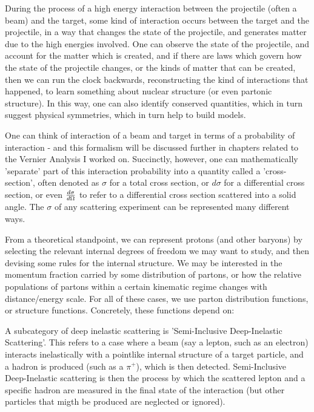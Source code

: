 During the process of a high energy interaction between the projectile (often a
beam) and the target,  some kind of interaction occurs between the target and
the projectile, in a way that changes the state of the projectile, and generates
matter due to the high energies involved. One can observe the state of the
projectile, and account for the matter which is created, and if there are laws
which govern how the state of the projectile changes, or the kinds of matter
that can be created, then we can run the clock backwards, reconstructing the
kind of interactions that happened, to learn something about nuclear structure
(or even partonic structure). In this way, one can also identify conserved
quantities, which in turn suggest physical symmetries, which in turn help to
build models.

One can think of interaction of a beam and target in terms of a probability of
interaction - and this formalism will be discussed further in chapters related
to the Vernier Analysis I worked on. Succinctly, however, one can mathematically
'separate' part of this interaction probability into a quantity called a
'cross-section', often denoted as $\sigma$ for a total cross section, or
$d\sigma$ for a differential cross section, or even ${d\sigma}\over{d\Omega}$ to
refer to a differential cross section scattered into a solid angle. The $\sigma$
of any scattering experiment can be represented many different ways.

From a theoretical standpoint, we can represent protons (and other baryons) by
selecting the relevant internal degrees of freedom we may want to study, and
then devising some rules for the internal structure. We may be interested in the
momentum fraction carried by some distribution of partons, or how the relative
populations of partons within a certain kinematic regime changes with
distance/energy scale. For all of these cases, we use parton distribution
functions, or structure functions. Concretely, these functions depend on:


A subcategory of deep inelastic scattering is 'Semi-Inclusive Deep-Inelastic
Scattering'. This refers to a case where a beam (say a lepton, such as an
electron) interacts inelastically with a pointlike internal structure of a
target particle, and a hadron is produced (such as a $\pi^+$), which is then
detected. Semi-Inclusive Deep-Inelastic scattering is then the process by which
the scattered lepton and a specific hadron are measured in the final state of
the interaction (but other particles that migth be produced are neglected or
ignored).

